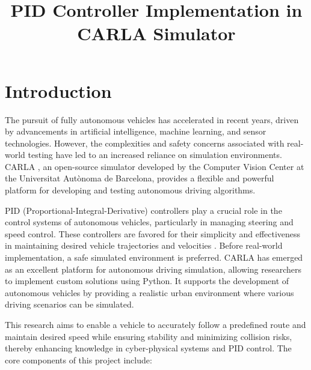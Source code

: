 \documentclass[conference]{IEEEtran}
\begin{document}
\title{PID Controller Implementation in CARLA Simulator}

\author{
}

\maketitle

\section{Introduction}

The pursuit of fully autonomous vehicles has accelerated in recent years, driven by advancements in artificial intelligence, machine learning, and sensor technologies. However, the complexities and safety concerns associated with real-world testing have led to an increased reliance on simulation environments. CARLA \cite{dosovitskiy2017carla}, an open-source simulator developed by the Computer Vision Center at the Universitat Autònoma de Barcelona, provides a flexible and powerful platform for developing and testing autonomous driving algorithms.

PID (Proportional-Integral-Derivative) controllers play a crucial role in the control systems of autonomous vehicles, particularly in managing steering and speed control. These controllers are favored for their simplicity and effectiveness in maintaining desired vehicle trajectories and velocities \cite{10.1108/ir-12-2019-0254}. Before real-world implementation, a safe simulated environment is preferred. CARLA has emerged as an excellent platform for autonomous driving simulation, allowing researchers to implement custom solutions using Python. It supports the development of autonomous vehicles by providing a realistic urban environment where various driving scenarios can be simulated.

This research aims to enable a vehicle to accurately follow a predefined route and maintain desired speed while ensuring stability and minimizing collision risks, thereby enhancing knowledge in cyber-physical systems and PID control. The core components of this project include:
\end{document}
